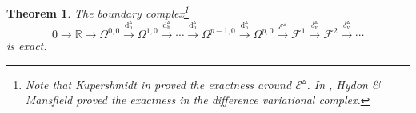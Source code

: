\documentclass[11pt]{article} %
\numberwithin{equation}{section}
\newcommand{\upd}{\operatorname{d}}
\newcommand{\uph}{\operatorname{h}}
\newcommand{\upv}{\operatorname{v}}
\newcommand{\mcE}{\mathcal{E}}
\newcommand{\dDh}{\upd^{\vartriangle}_{\uph}}
\theoremstyle{plain}
\newtheorem{thm}{Theorem}[section]
\theoremstyle{definition}
\begin{document}
\begin{thm}
The boundary complex\footnote{Note that Kupershmidt in \cite{Ku1985} proved the exactness around $\mcE^{\vartriangle}$. In \cite{HyMa2004}, Hydon \& Mansfield proved the exactness in the difference variational complex. }
\begin{equation}
0\rightarrow\mathbb{R}\rightarrow
\Omega^{0,0}\stackrel{\dDh}{\longrightarrow}
\Omega^{1,0}\stackrel{\dDh}{\longrightarrow}
\cdots\stackrel{\dDh}{\longrightarrow}
\Omega^{p-1,0}\stackrel{\dDh}{\longrightarrow}
\Omega^{p,0}\stackrel{\mcE^{\vartriangle}}{\longrightarrow}
\mathscr{F}^1\stackrel{\delta^{\vartriangle}_{\upv}}{\longrightarrow}
\mathscr{F}^2\stackrel{\delta^{\vartriangle}_{\upv}}{\longrightarrow}
\cdots
\end{equation}
is exact.
\end{thm}
\end{document}
